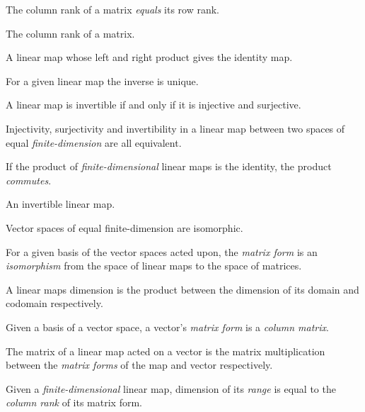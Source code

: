 \begin{multicols}{3}
  The column rank of a matrix \textit{equals} its row rank.

  The column rank of a matrix.


  A linear map whose left and right product gives the identity map.

  For a given linear map the inverse is unique.

  A linear map is invertible if and only if it is injective and surjective.

  Injectivity, surjectivity and invertibility in a linear map between two spaces of equal \textit{finite-dimension} are all equivalent.

  If the product of \textit{finite-dimensional} linear maps is the identity, the product \textit{commutes}.

  An invertible linear map.

  Vector spaces of equal finite-dimension are isomorphic.

  For a given basis of the vector spaces acted upon, the \textit{matrix form} is an
  \textit{isomorphism} from the space of linear maps to the space of matrices.

  A linear maps dimension is the product between the dimension of its domain and codomain respectively.

  Given a basis of a vector space, a vector's \textit{matrix form} is a \textit{column matrix}.

  
  The matrix of a linear map acted on a vector is the matrix multiplication between
  the \textit{matrix forms} of the map and vector respectively.
  
  Given a \textit{finite-dimensional} linear map,
  dimension of its \textit{range} is equal to the \textit{column rank} of its matrix form.
  

\end{multicols}
